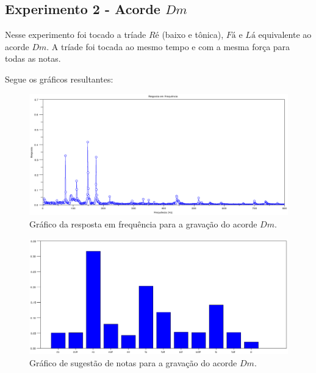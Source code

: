 \subsection{Experimento 2 - Acorde $Dm$}
\label{sec:experimento2}

Nesse experimento foi tocado a tríade $Ré$ (baixo e tônica), $Fá$ e $Lá$ equivalente ao acorde $Dm$. A tríade foi tocada ao mesmo tempo e com a mesma força para todas as notas.

Segue os gráficos resultantes:

\begin{figure}[h]
	\centering
		\includegraphics[keepaspectratio=true,scale=0.49]{figuras/Dm/fft_Dm.eps}
	\caption{Gráfico da resposta em frequência para a gravação do acorde $Dm$.}
  \label{fig:espectro_Dm}
\end{figure}

\begin{figure}[h]
	\centering
		\includegraphics[keepaspectratio=true,scale=0.49]{figuras/Dm/notas_Dm.eps}
	\caption{Gráfico de sugestão de notas para a gravação do acorde $Dm$.}
  \label{fig:notas_Dm}
\end{figure}

